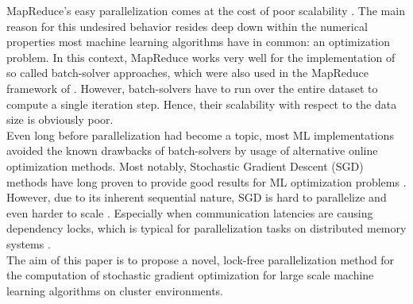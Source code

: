 \documentclass{acm_proc_article-sp}
\begin{document}
MapReduce's easy parallelization comes at the cost of poor scalability
\cite{recht2011hogwild}. The main reason for this undesired behavior 
resides deep down within the numerical properties most machine learning 
algorithms have in common: an optimization problem. In this context, 
MapReduce works very well for the implementation of so called batch-solver
approaches, which were also used in the MapReduce framework of 
\cite{chu2007map}. However, 
batch-solvers have to run over the entire dataset to compute a single 
iteration step. Hence, their scalability with respect to the data size is
obviously poor.\\
Even long before parallelization had become a topic, most ML implementations 
avoided the known drawbacks of batch-solvers by usage of alternative online
optimization methods. Most notably, Stochastic Gradient Descent (SGD) methods 
have long  proven to provide good results for ML optimization problems \cite{recht2011hogwild}.
However, due to its inherent sequential nature, SGD is hard to parallelize and even harder 
to scale \cite{recht2011hogwild}.
Especially when communication latencies are causing dependency locks,
which is typical for parallelization tasks on distributed memory systems \cite{SGDsmola}.\\ 
The aim of this paper is to propose a novel, lock-free parallelization
method for the computation of stochastic gradient optimization for large scale 
machine learning algorithms on cluster 
environments.  
\end{document}
